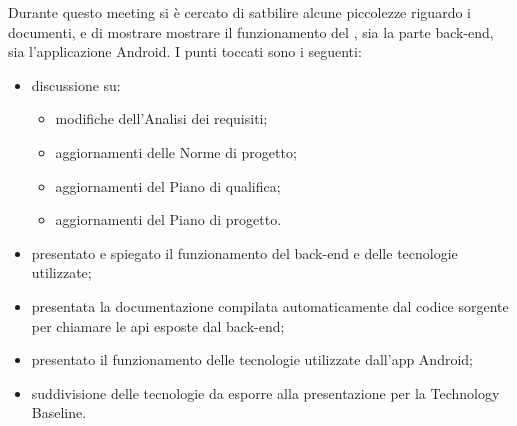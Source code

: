 Durante questo meeting si è cercato di satbilire alcune piccolezze riguardo i documenti, e di mostrare mostrare il funzionamento del , sia la parte back-end, sia l'applicazione Android.
I punti toccati sono i seguenti:
\begin{itemize}
   \item discussione su:
   \begin{itemize}
      \item modifiche dell'Analisi dei requisiti;
      \item aggiornamenti delle Norme di progetto;
      \item aggiornamenti del Piano di qualifica;
      \item aggiornamenti del Piano di progetto.
   \end{itemize}
\item presentato e spiegato il funzionamento del back-end e delle tecnologie utilizzate;
\item presentata la documentazione compilata automaticamente dal codice sorgente per chiamare le api  esposte dal back-end;
\item presentato il funzionamento delle tecnologie utilizzate dall'app Android;
\item suddivisione delle tecnologie da esporre alla presentazione per la Technology Baseline.
\end{itemize}


